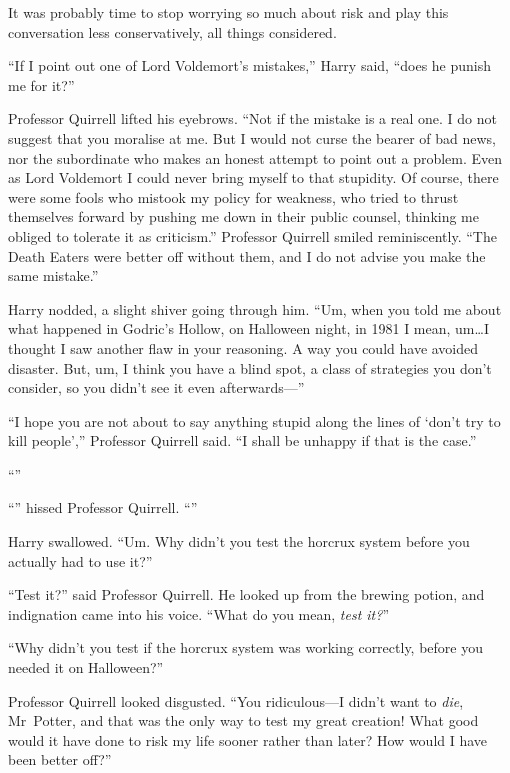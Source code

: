 It was probably time to stop worrying so much about risk and play this conversation less conservatively, all things considered.

“If I point out one of Lord Voldemort’s mistakes,” Harry said, “does he punish me for it?”

Professor Quirrell lifted his eyebrows. “Not if the mistake is a real one. I do not suggest that you moralise at me. But I would not curse the bearer of bad news, nor the subordinate who makes an honest attempt to point out a problem. Even as Lord Voldemort I could never bring myself to that stupidity. Of course, there were some fools who mistook my policy for weakness, who tried to thrust themselves forward by pushing me down in their public counsel, thinking me obliged to tolerate it as criticism.” Professor Quirrell smiled reminiscently. “The Death Eaters were better off without them, and I do not advise you make the same mistake.”

Harry nodded, a slight shiver going through him. “Um, when you told me about what happened in Godric’s Hollow, on Halloween night, in 1981 I mean, um…I thought I saw another flaw in your reasoning. A way you could have avoided disaster. But, um, I think you have a blind spot, a class of strategies you don’t consider, so you didn’t see it even afterwards—”

“I hope you are not about to say anything stupid along the lines of ‘don’t try to kill people’,” Professor Quirrell said. “I shall be unhappy if that is the case.”

“”

“” hissed Professor Quirrell. “”

Harry swallowed. “Um. Why didn’t you test the horcrux system before you actually had to use it?”

“Test it?” said Professor Quirrell. He looked up from the brewing potion, and indignation came into his voice. “What do you mean, \emph{test it?}”

“Why didn’t you test if the horcrux system was working correctly, before you needed it on Halloween?”

Professor Quirrell looked disgusted. “You ridiculous—I didn’t want to \emph{die}, Mr~Potter, and that was the only way to test my great creation! What good would it have done to risk my life sooner rather than later? How would I have been better off?”

